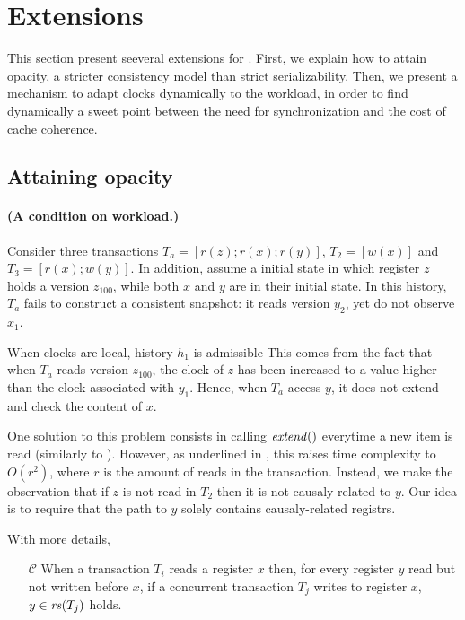 \section{Extensions}

This section present seeveral extensions for .
First, we explain how to attain opacity, a stricter consistency model than strict serializability.
Then, we present a mechanism to adapt clocks dynamically to the workload, in order to find dynamically a sweet point between the need for synchronization and the cost of cache coherence.

\subsection{Attaining opacity}

\paragraph{(A condition on workload.)}
Consider three transactions $T_a=[r(z);r(x);r(y)]$, $T_2=[w(x)]$ and $T_3=[r(x);w(y)]$.
In addition, assume a initial state in which register $z$ holds a version $z_{100}$, while both $x$ and $y$ are in their initial state.
In this history, $T_a$ fails to construct a consistent snapshot: it reads version $y_2$, yet do not observe $x_1$.



When clocks are local, history $h_1$ is admissible 
This comes from the fact that when $T_a$ reads version $z_{100}$, the clock of $z$ has been increased to a value higher than the clock associated with $y_1$.
Hence, when $T_a$ access $y$, it does not extend and check the content of $x$.

One solution to this problem consists in calling $\stmExtend{}$ everytime a new item is read (similarly to \cite{}).
However, as underlined in , this raises time complexity to $O(r^2)$, where $r$ is the amount of reads in the transaction.
Instead, we make the observation that if $z$ is not read in $T_2$ then it is not causaly-related to $y$.
Our idea is to require that the path to $y$ solely contains causaly-related registrs.

With more details,

\begin{itemize}
\item[$\mathcal{C}$]
  When a transaction $T_i$ reads a register $x$ then, for every register $y$ read but not written before $x$, if a concurrent transaction $T_j$ writes to register $x$, $y \in \readSetOf{T_j}$ holds.
\end{itemize}

